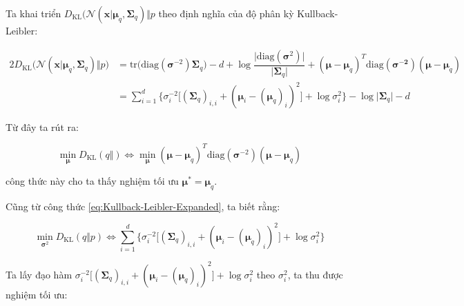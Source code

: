 \documentclass[14pt, a4paper]{article}
\numberwithin{equation}{section}
\numberwithin{figure}{section}
\numberwithin{dl}{section}
\numberwithin{md}{section}
\numberwithin{bd}{section}
\numberwithin{dn}{section}
\numberwithin{hq}{section}
\begin{document}
    Ta khai triển $D_{\mathrm{KL}} \big( \mathcal{N} (\boldsymbol{x} \vert \boldsymbol{\mu}_q, \boldsymbol{\Sigma}_q) \Vert p$ theo định nghĩa của độ phân kỳ Kullback-Leibler:

    \begin{equation} \label{eq:Kullback-Leibler-Expanded}
        \begin{aligned}
            2 D_{\mathrm{KL}} \big( \mathcal{N} (\boldsymbol{x} \vert \boldsymbol{\mu}_q, \boldsymbol{\Sigma}_q) \Vert p \big) &= \mathrm{tr} \big( \mathrm{diag} (\boldsymbol{\sigma}^{-2}) \boldsymbol{\Sigma}_q \big) - d + \log \dfrac{\lvert \mathrm{diag}(\boldsymbol{\sigma}^2) \rvert}{\lvert \boldsymbol{\Sigma}_q \rvert} + (\boldsymbol{\mu} - \boldsymbol{\mu}_q)^T \mathrm{diag}(\boldsymbol{\sigma^{-2}}) (\boldsymbol{\mu} - \boldsymbol{\mu}_q) \\
            &=\sum_{i=1}^d \Big \lbrace \sigma_i^{-2} \big \lbrack (\boldsymbol{\Sigma}_q)_{i, i} + (\boldsymbol{\mu}_i - (\boldsymbol{\mu}_q)_i)^2 \big\rbrack + \log \sigma_i^2 \Big \rbrace - \log \lvert \boldsymbol{\Sigma}_q \rvert  - d
        \end{aligned}
    \end{equation}

    Từ đây ta rút ra:

    \begin{equation*}
        \min_{\boldsymbol{\mu}} D_{\mathrm{KL}} (q \Vert) \Leftrightarrow \min_{\boldsymbol{\mu}} (\boldsymbol{\mu} - \boldsymbol{\mu}_q)^T \mathrm{diag}(\boldsymbol{\sigma}^{-2}) (\boldsymbol{\mu} - \boldsymbol{\mu}_q)
    \end{equation*}

    công thức này cho ta thấy nghiệm tối ưu $\boldsymbol{\mu}^{\ast} = \boldsymbol{\mu}_q$.

    Cũng từ công thức \ref{eq:Kullback-Leibler-Expanded}, ta biết rằng:

    \begin{equation}
        \min_{\boldsymbol{\sigma}^2} D_{\mathrm{KL}} (q \Vert p) \Leftrightarrow \sum_{i=1}^d \Big \lbrace \sigma_i^{-2} \big \lbrack (\boldsymbol{\Sigma}_q)_{i, i} + (\boldsymbol{\mu}_i - (\boldsymbol{\mu}_q)_i)^2 \big \rbrack + \log \sigma_i^2  \Big \rbrace
    \end{equation}

    Ta lấy đạo hàm $\sigma_i^{-2} \big \lbrack (\boldsymbol{\Sigma}_q)_{i, i} + (\boldsymbol{\mu}_i - (\boldsymbol{\mu}_q)_i)^2 \big \rbrack + \log \sigma_i^2$ theo $\sigma_i^2$, ta thu được nghiệm tối ưu:
    
\end{document}
